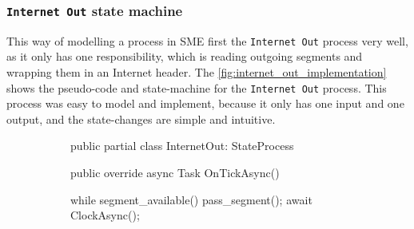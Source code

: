 \subsubsection{\texttt{Internet Out} state machine}
This way of modelling a process in SME first the \texttt{Internet Out} process
very well, as it only has one responsibility, which is reading outgoing segments
and wrapping them in an Internet header. The \autoref{fig:internet_out_implementation} shows the pseudo-code and state-machine for the \texttt{Internet Out}
process. This process was easy to model and implement, because it only has one
input and one output, and the state-changes are simple and intuitive.

\begin{figure}[htpb]
    \centering
    \begin{subfigure}[b]{0.45\textwidth}
        \centering
\begin{mintedcsharp}
public partial class InternetOut: StateProcess
{
public override async Task OnTickAsync()
{
  while segment_available() {
    pass_segment();
    await ClockAsync();
  }

}}
\end{mintedcsharp}
\end{subfigure}
\end{figure}
